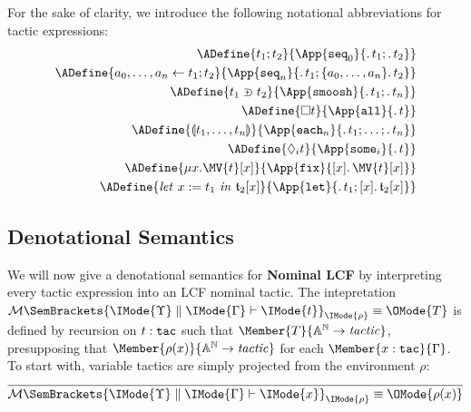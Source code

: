 For the sake of clarity, we introduce the following notational abbreviations
for tactic expressions:
\begin{align*}
  \ADefine{
    t_1;t_2
  }{
    \App{\mathtt{seq}_0}{\MkAbs{}{}{t_1};\MkAbs{}{}{t_2}}
  }\\
  \ADefine{
    \TacSeq{t_1}{a_0,\dots,a_n}{t_2}
  }{
  \App{\mathtt{seq}_n}{\MkAbs{}{}{t_1};\MkAbs{a_0,\dots,a_n}{}{t_2}}
  }\\
  \ADefine{
    \TacSmoosh{t_1}{t_2}
  }{
    \App{\mathtt{smoosh}}{\MkAbs{}{}{t_1};\MkAbs{}{}{t_n}}
  }\\
  \ADefine{
    \Box t
  }{
    \App{\mathtt{all}}{\MkAbs{}{}{t}}
  }\\
  \ADefine{
    \TacEach{t_1,\dots,t_n}
  }{
    \App{\mathtt{each}_n}{\MkAbs{}{}{t_1};\dots;\MkAbs{}{}{t_n}}
  }\\
  \ADefine{
    \Diamond_i t
  }{
    \App{\mathtt{some}_i}{\MkAbs{}{}{t}}
  }\\
  \ADefine{
    \TacFix{x}{\MV{t}[x]}
  }{
    \App{\mathtt{fix}}{\MkAbs{}{x}{\MV{t}[x]}}
  }\\
  \ADefine{
    \TacLet{t_1}{x}{\mathfrak{t}_2[x]}
  }{
    \App{\mathtt{let}}{
      \MkAbs{}{}{t_1};
      \MkAbs{}{x}{\mathfrak{t}_2[x]}
    }
  }
\end{align*}

\subsection{Denotational Semantics}

\newcommand\LCFElaboration[5]{%
  \mathcal{M}%
  \SemBrackets{
    #1\parallel #2\vdash%
    #3%
  }_{#5}%
}

\newcommand\LCFElab[6]{%
  \LCFElaboration{\IMode{#1}}{\IMode{#2}}{\IMode{#3}}{\IMode{#4}}{\IMode{#5}}%
  \equiv\OMode{#6}%
}

We will now give a denotational semantics for \textbf{Nominal LCF} by
interpreting every tactic expression into an LCF nominal tactic. The
intepretation $\LCFElab{\Upsilon}{\Gamma}{t}{\tau}{\rho}{T}$ is defined by
recursion on $t:\mathtt{tac}$ such that $\Member{T}{\LCFNominalTactic}$,
presupposing that $\Member{\rho(x)}{\LCFNominalTactic}$ for each
$\Member{x:\SortTac}{\Gamma}$.  To start with, variable tactics are simply
projected from the environment $\rho$:
\[
  \infer{
    \LCFElab{\Upsilon}{\Gamma}{x}{\SortTac}{\rho}{\rho(x)}
  }{
  }
\]

